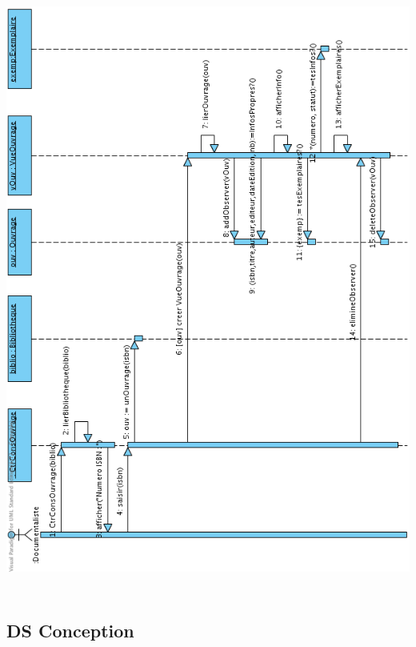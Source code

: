\documentclass[a4paper,10pt]{report}
\begin{document}
\bigskip
\includegraphics[height=200mm]{ConsOuvMVC.png}
\newpage

\subsection*{DS Conception}
\end{document}
